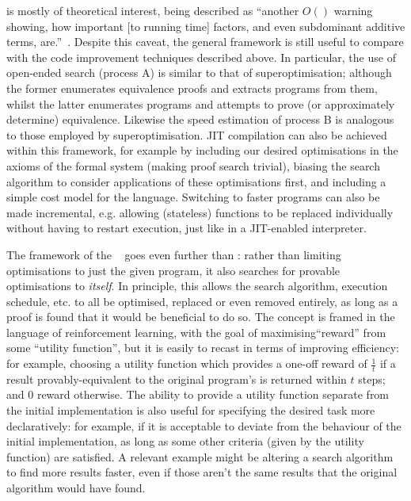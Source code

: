 \hsearch{} is mostly of theoretical interest, being described as ``another $O()$
warning showing, how important [to running time] factors, and even subdominant
additive terms, are.''~\cite{TODO: Hutter, page 4}. Despite this caveat, the
general framework is still useful to compare with the code improvement
techniques described above. In particular, the use of open-ended search (process
A) is similar to that of superoptimisation; although the former enumerates
equivalence proofs and extracts programs from them, whilst the latter enumerates
programs and attempts to prove (or approximately determine)
equivalence. Likewise the speed estimation of process B is analogous to those
employed by superoptimisation. JIT compilation can also be achieved within this
framework, for example by including our desired optimisations in the axioms of
the formal system (making proof search trivial), biasing the search algorithm to
consider applications of these optimisations first, and including a simple cost
model for the language. Switching to faster programs can also be made
incremental, e.g. allowing (stateless) functions to be replaced individually
without having to restart execution, just like in a JIT-enabled interpreter.

The framework of the \goedelmachine{}~\cite{Schmidhuber:05icann} goes even
further than \hsearch{}: rather than limiting optimisations to just the given
program, it also searches for provable optimisations to \emph{itself}. In
principle, this allows the search algorithm, execution schedule, etc. to all be
optimised, replaced or even removed entirely, as long as a proof is found that
it would be beneficial to do so. The \goedelmachine{} concept is framed in the
language of reinforcement learning, with the goal of maximising``reward'' from
some ``utility function'', but it is easily to recast in terms of improving
efficiency: for example, choosing a utility function which provides a one-off
reward of $\frac{1}{t}$ if a result provably-equivalent to the original
program's is returned within $t$ steps; and 0 reward otherwise. The ability to
provide a utility function separate from the initial implementation is also
useful for specifying the desired task more declaratively: for example, if it is
acceptable to deviate from the behaviour of the initial implementation, as long
as some other criteria (given by the utility function) are satisfied. A relevant
example might be altering a search algorithm to find more results faster, even
if those aren't the same results that the original algorithm would have found.

